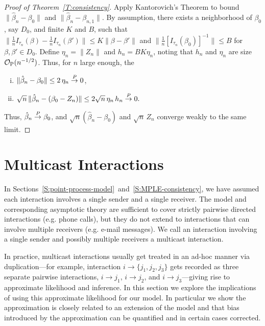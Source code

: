 \documentclass[aoas,preprint]{imsart}
\begin{document}
\begin{proof}[Proof of Theorem~\ref{T:consistency}]
Apply Kantorovich's Theorem to bound $\| \hat \beta_n - \beta_0 \|$
and $\| \hat \beta_n - \beta_{n,1} \|$.  By assumption, there exists
a neighborhood of $\beta_0$, say $D_0$, and finite $K$ and $B$, such that
\(
    \|
        \frac{1}{n} I_{\tau_n} (\beta)
        -
        \frac{1}{n} I_{\tau_n}(\beta')
    \|
    \leq
    K
    \|
        \beta
        -
        \beta'
    \|
\)
and
\(
    \| \frac{1}{n} [I_{\tau_n}(\beta_0)]^{-1} \| \leq B
\)
for $\beta, \beta' \in D_0$.
Define $\eta_n = \| Z_n \|$ and $h_n = B K \eta_n$, noting that $h_n$ and
$\eta_n$ are size $\mathcal{O}_\text{P}(n^{-1/2})$.  Thus, for $n$ large enough, the
\begin{enumerate}[(i)]
    \item $\| \hat \beta_n - \beta_0 \| \leq 2 \, \eta_n \overset{\mathit{P}}{\to} 0$,
    \item
        \(
            \sqrt{n} \, \| \hat \beta_n - (\beta_0 - Z_n) \|
            \leq
            2 \sqrt{n} \, \eta_n \, h_n
            \overset{\mathit{P}}{\to} 0.
        \)
\end{enumerate}
Thus, $\hat \beta_n \overset{\mathit{P}}{\to} \beta_0$, and $\sqrt{n} (\hat \beta_n - \beta_0)$
and $\sqrt{n} \, Z_n$ converge weakly to the same limit.

\end{proof}

\section{Multicast Interactions}\label{S:multiple-receivers}

In Sections~\ref{S:point-process-model}~and~\ref{S:MPLE-consistency},
we have assumed each interaction involves a single sender and a single 
receiver.  The model and corresponding asymptotic theory are sufficient to 
cover strictly pairwise directed interactions (e.g. phone calls), but they
do not extend to interactions that can involve multiple receivers (e.g. e-mail 
messages).  We call an interaction involving a single sender and possibly 
multiple receivers a multicast interaction.  

In practice, multicast interactions usually get treated in an ad-hoc manner 
via duplication---for example, interaction $i \to \{ j_1, j_2, j_3 \}$ gets 
recorded as three separate pairwise interactions, $i \to j_1$, $i \to j_2$, 
and $i \to j_3$---giving rise to approximate likelihood and inference.
In this section we explore the implications of using this approximate
likelihood for our model.  In particular we show  the approximation is closely 
related to an extension of the model and that bias introduced by the 
approximation can be quantified and in certain cases corrected.
\end{document}
